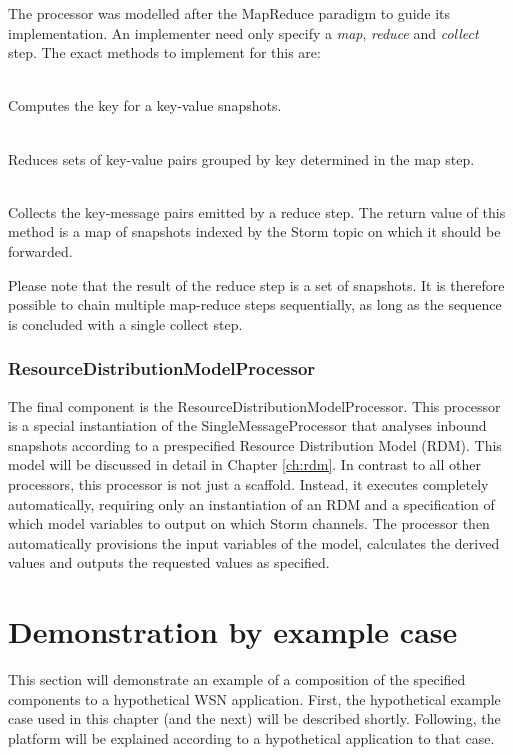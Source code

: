 The processor was modelled after the MapReduce paradigm \cite{mapreduce} to guide its implementation. An implementer need only specify a \emph{map}, \emph{reduce} and \emph{collect} step.  The exact methods to implement for this are:
\begin{description}[font=\normalfont]
\nospace
\item[\emph{map(Message m) : String}] \hfill \\ Computes the key for a key-value snapshots.
\item[\emph{reduce(String key, List\textless Message\textgreater\ l) : Message}] \hfill \\ Reduces sets of key-value pairs grouped by key determined in the map step.
\item[\emph{collect(Map\textless String,Message\textgreater\ m) : Map\textless String,Message\textgreater}] \hfill \\ Collects the key-message pairs emitted by a reduce step. The return value of this method is a map of snapshots indexed by the Storm topic on which it should be forwarded.
\end{description}
Please note that the result of the reduce step is a set of snapshots. It is therefore possible to chain multiple map-reduce steps sequentially, as long as the sequence is concluded with a single collect step.

\subsubsection*{ResourceDistributionModelProcessor}
The final component is the ResourceDistributionModelProcessor. This processor is a special instantiation of the SingleMessageProcessor that analyses inbound snapshots according to a prespecified Resource Distribution Model (RDM). This model will be discussed in detail in Chapter \ref{ch:rdm}. In contrast to all other processors, this processor is not just a scaffold. Instead, it executes completely automatically, requiring only an instantiation of an RDM and a specification of which model variables to output on which Storm channels. The processor then automatically provisions the input variables of the model, calculates the derived values and outputs the requested values as specified.

\section{Demonstration by example case}
\label{sec:example_application_topology}
This section will demonstrate an example of a composition of the specified components to a hypothetical WSN application. First, the hypothetical example case used in this chapter (and the next) will be described shortly. Following, the platform will be explained according to a hypothetical application to that case.

